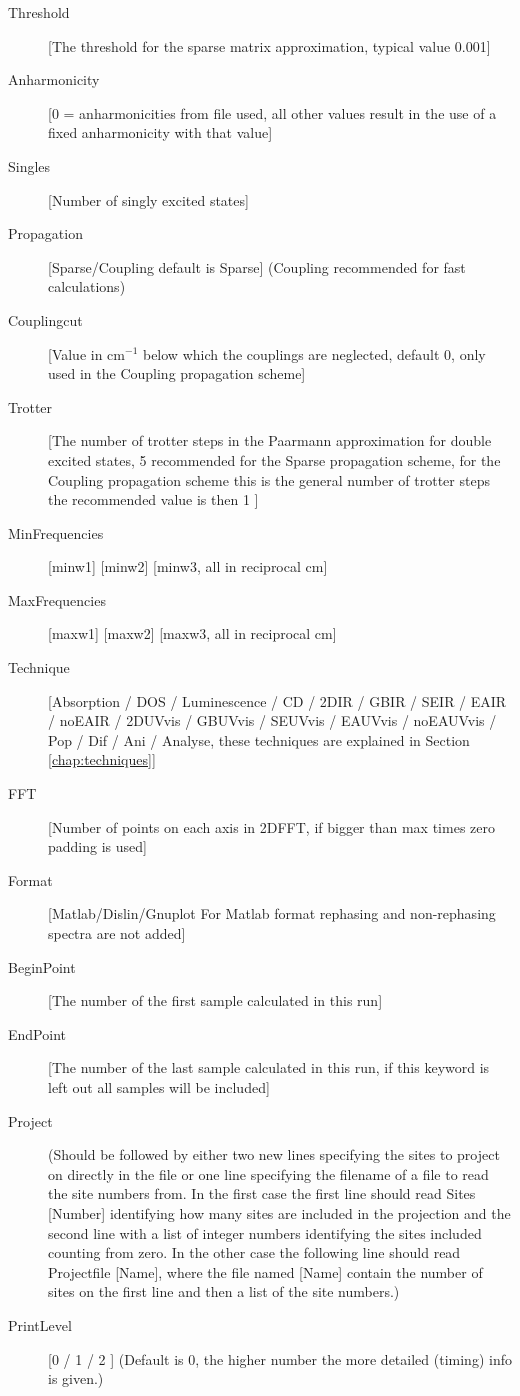 \begin{description}
\item [Threshold][The threshold for the sparse matrix approximation, typical value 0.001]
\item [Anharmonicity] [0 = anharmonicities from file used, all other values result in the use of a fixed anharmonicity with that value]
\item [Singles] [Number of singly excited states]
\item [Propagation] [Sparse/Coupling default is Sparse] (Coupling recommended for fast calculations)
\item [Couplingcut] [Value in cm$^{-1}$ below which the couplings are neglected, default 0, only used in the Coupling propagation scheme]
\item [Trotter] [The number of trotter steps in the Paarmann approximation for double excited 
states, 5 recommended for the Sparse propagation scheme, for the Coupling propagation scheme this is the general number of trotter steps the recommended value is then 1 ]
\item [MinFrequencies] [minw1] [minw2] [minw3, all in reciprocal cm]
\item [MaxFrequencies] [maxw1] [maxw2] [maxw3, all in reciprocal cm]
\item [Technique] [Absorption / DOS / Luminescence / CD / 2DIR / GBIR / SEIR / EAIR / noEAIR / 2DUVvis / GBUVvis / SEUVvis / EAUVvis / noEAUVvis / Pop / Dif / Ani / Analyse, these techniques are explained in Section \ref{chap:techniques}]
\item [FFT] [Number of points on each axis in 2DFFT, if bigger than max times zero padding is used]
\item [Format] [Matlab/Dislin/Gnuplot For Matlab format rephasing and non-rephasing spectra are not added] 
\item [BeginPoint] [The number of the first sample calculated in this run]
\item [EndPoint] [The number of the last sample calculated in this run, if this keyword is left out all samples will be included]
\item [Project] (Should be followed by either two new lines specifying the sites to project on directly in the file or one line specifying the filename of a file to read the site numbers from. In the first case the first line should read Sites [Number] identifying how many sites are included in the projection and the second line with a list of integer numbers identifying the sites included counting from zero. In the other case the following line should read Projectfile [Name], where the file named [Name] contain the number of sites on the first line and then a list of the site numbers.)
\item [PrintLevel] [0 / 1 / 2 ] (Default is 0, the higher number the more detailed (timing) info is given.)
\end{description}

